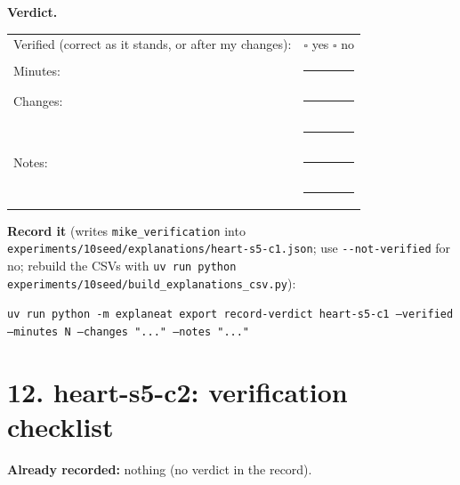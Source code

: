 \documentclass[a4paper,11pt]{article}
\begin{document}
\textbf{Verdict.}

\begin{tabularx}{\linewidth}{@{}lX@{}}
Verified (correct as it stands, or after my changes): & $\square$ yes \quad $\square$ no \\[4pt]
Minutes: & \rule{3cm}{0.4pt} \\[4pt]
Changes: & \rule{\linewidth}{0.4pt} \\[10pt]
 & \rule{\linewidth}{0.4pt} \\[4pt]
Notes: & \rule{\linewidth}{0.4pt} \\[10pt]
 & \rule{\linewidth}{0.4pt} \\
\end{tabularx}

\textbf{Record it} (writes \texttt{mike\_verification} into \texttt{experiments/10seed/explanations/heart-s5-c1.json}; use \texttt{-{}-not-verified} for no; rebuild the CSVs with \texttt{uv run python experiments/10seed/build\_explanations\_csv.py}):

{\footnotesize\raggedright\texttt{uv run python -m explaneat export record-verdict heart-s5-c1 --verified --minutes N --changes "..." --notes "..."}\par}


\clearpage














\clearpage
\section*{12. heart-s5-c2: verification checklist}
\label{rev:heart-s5-c2}
\textbf{Already recorded:} nothing (no verdict in the record).
\end{document}
